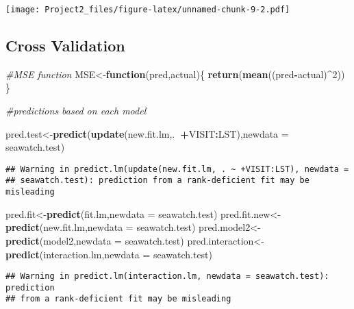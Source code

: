 \documentclass[]{article}
\newenvironment{Shaded}{\begin{snugshade}}{\end{snugshade}}
\newcommand{\KeywordTok}[1]{\textcolor[rgb]{0.13,0.29,0.53}{\textbf{#1}}}
\newcommand{\DataTypeTok}[1]{\textcolor[rgb]{0.13,0.29,0.53}{#1}}
\newcommand{\DecValTok}[1]{\textcolor[rgb]{0.00,0.00,0.81}{#1}}
\newcommand{\CommentTok}[1]{\textcolor[rgb]{0.56,0.35,0.01}{\textit{#1}}}
\newcommand{\ControlFlowTok}[1]{\textcolor[rgb]{0.13,0.29,0.53}{\textbf{#1}}}
\newcommand{\OperatorTok}[1]{\textcolor[rgb]{0.81,0.36,0.00}{\textbf{#1}}}
\newcommand{\NormalTok}[1]{#1}
\begin{document}
\texttt{[image: Project2\_files/figure-latex/unnamed-chunk-9-2.pdf]}

\subsection{Cross Validation}\label{cross-validation}

\begin{Shaded}
\begin{Highlighting}[]
\CommentTok{#MSE function}
\NormalTok{MSE<-}\ControlFlowTok{function}\NormalTok{(pred,actual)\{}
  \KeywordTok{return}\NormalTok{(}\KeywordTok{mean}\NormalTok{((pred}\OperatorTok{-}\NormalTok{actual)}\OperatorTok{^}\DecValTok{2}\NormalTok{))}
\NormalTok{\}}

\CommentTok{#predictions based on each model}

\NormalTok{pred.test<-}\KeywordTok{predict}\NormalTok{(}\KeywordTok{update}\NormalTok{(new.fit.lm,.}\OperatorTok{~+}\NormalTok{VISIT}\OperatorTok{:}\NormalTok{LST),}\DataTypeTok{newdata =}\NormalTok{ seawatch.test) }
\end{Highlighting}
\end{Shaded}

\begin{verbatim}
## Warning in predict.lm(update(new.fit.lm, . ~ +VISIT:LST), newdata =
## seawatch.test): prediction from a rank-deficient fit may be misleading
\end{verbatim}

\begin{Shaded}
\begin{Highlighting}[]
\NormalTok{pred.fit<-}\KeywordTok{predict}\NormalTok{(fit.lm,}\DataTypeTok{newdata =}\NormalTok{ seawatch.test)}
\NormalTok{pred.fit.new<-}\KeywordTok{predict}\NormalTok{(new.fit.lm,}\DataTypeTok{newdata =}\NormalTok{ seawatch.test)}
\NormalTok{pred.model2<-}\KeywordTok{predict}\NormalTok{(model2,}\DataTypeTok{newdata =}\NormalTok{ seawatch.test)}
\NormalTok{pred.interaction<-}\KeywordTok{predict}\NormalTok{(interaction.lm,}\DataTypeTok{newdata =}\NormalTok{ seawatch.test)}
\end{Highlighting}
\end{Shaded}

\begin{verbatim}
## Warning in predict.lm(interaction.lm, newdata = seawatch.test): prediction
## from a rank-deficient fit may be misleading
\end{verbatim}
\end{document}
